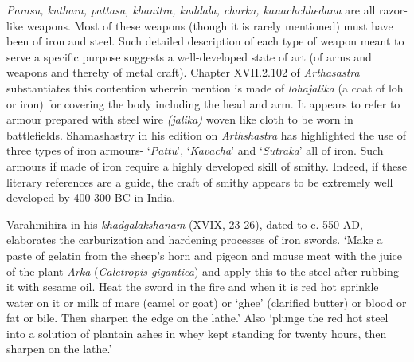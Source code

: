 \textit{Parasu, kuthara, pattasa, khanitra, kuddala, charka, kanachchhedana} are all razor-like weapons. Most of these weapons (though it is rarely mentioned) must have been of iron and steel. Such detailed description of each type of weapon meant to serve a specific purpose suggests a well-developed state of art (of arms and weapons and thereby of metal craft). Chapter XVII.2.102 of \textit{Arthasastra} substantiates this contention wherein mention is made of \textit{lohajalika }(a coat of loh or iron) for covering the body including the head and arm. It appears to refer to armour prepared with steel wire \textit{(jalika)} woven like cloth to be worn in battlefields. Shamashastry in his edition on \textit{Arthshastra} has highlighted the use of three types of iron armours- ‘\textit{Pattu}’, ‘\textit{Kavacha}’ and ‘\textit{Sutraka}’ all of iron. Such armours if made of iron require a highly developed skill of smithy. Indeed, if these literary references are a guide, the craft of smithy appears to be extremely well developed by 400-300 BC in India.

Varahmihira in his \textit{khadgalakshanam} (XVIX, 23-26), dated to c. 550 AD, elaborates the carburization and hardening processes of iron swords. ‘Make a paste of gelatin from the sheep’s horn and pigeon and mouse meat with the juice of the plant \textit{\underline{Arka}} (\textit{Caletropis gigantica}) and apply this to the steel after rubbing it with sesame oil. Heat the sword in the fire and when it is red hot sprinkle water on it or milk of mare (camel or goat) or ‘ghee’ (clarified butter) or blood or fat or bile. Then sharpen the edge on the lathe.’ Also ‘plunge the red hot steel into a solution of plantain ashes in whey kept standing for twenty hours, then sharpen on the lathe.’

